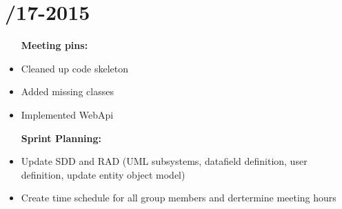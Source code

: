 \section{/17-2015} %
\attend{\at}{\nat}{\at}{\at}


\begin{itemize}
	\item [\textbf{Meeting pins:}]
	\item Cleaned up code skeleton
	\item Added missing classes
	\item Implemented WebApi
\end{itemize}

\begin{itemize}
	\item [\textbf{Sprint Planning:}]
	\item Update SDD and RAD (UML subsystems, datafield definition, user definition, update entity object model)
	\item Create time schedule for all group members and dertermine meeting hours
\end{itemize}